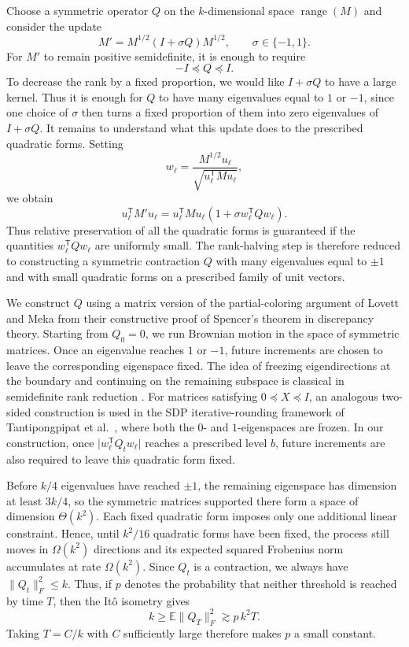 \documentclass[11pt,reqno,letterpaper]{amsart}
\newcommand{\E}{\mathbb E}
\begin{document}
Choose a symmetric operator $Q$ on the $k$-dimensional space
$\operatorname{range}(M)$ and consider the update
\[
 M'
 =
 M^{1/2}(I+\sigma Q)M^{1/2},
 \qquad \sigma\in\{-1,1\}.
\]
For $M'$ to remain positive semidefinite, it is
enough to require
\[
 -I\preceq Q\preceq I.
\]
To decrease the rank by a fixed proportion, we would like
$I+\sigma Q$ to have a large kernel. Thus it is enough for $Q$ to have
many eigenvalues equal to $1$ or $-1$, since one choice of $\sigma$
then turns a fixed proportion of them into zero eigenvalues of
$I+\sigma Q$. It remains to understand what this update does to the prescribed
quadratic forms. Setting
\[
 w_\ell
 =
 \frac{M^{1/2}u_\ell}
 {\sqrt{u_\ell^{\mathsf T}Mu_\ell}},
\]
we obtain
\[
 u_\ell^{\mathsf T}M'u_\ell
 =
 u_\ell^{\mathsf T}Mu_\ell
 \left(1+\sigma w_\ell^{\mathsf T}Qw_\ell\right).
\]
Thus relative preservation of all the quadratic forms is guaranteed if
the quantities $w_\ell^{\mathsf T}Qw_\ell$ are uniformly small. The
rank-halving step is therefore reduced to constructing a symmetric
contraction $Q$ with many eigenvalues equal to $\pm1$ and with small
quadratic forms on a prescribed family of unit vectors.

We construct $Q$ using a matrix version of the partial-coloring
argument of Lovett and Meka \cite{LM} from their constructive proof of
Spencer's theorem in discrepancy theory. Starting from $Q_0=0$, we run
Brownian motion in the space of symmetric matrices. Once an eigenvalue
reaches $1$ or $-1$, future increments are chosen to leave the
corresponding eigenspace fixed. The idea of freezing eigendirections at the boundary and continuing on the remaining subspace is classical in semidefinite rank reduction \cite{Barvinok,Pataki}. For matrices satisfying $0\preceq X\preceq I$, an analogous two-sided construction is used in the SDP iterative-rounding framework of Tantipongpipat et al.~\cite{TSSMV19}, where both the $0$- and $1$-eigenspaces are frozen. In our construction, once $\lvert w_\ell^{\mathsf T}Q_tw_\ell\rvert$ reaches a prescribed level $b$, future increments are also required to leave this quadratic form fixed.

Before $k/4$ eigenvalues have reached $\pm1$, the remaining eigenspace
has dimension at least $3k/4$, so the symmetric matrices supported there
form a space of dimension $\Theta(k^2)$. Each fixed quadratic form
imposes only one additional linear constraint. Hence, until $k^2/16$
quadratic forms have been fixed, the process still moves in
$\Omega(k^2)$ directions and its expected
squared Frobenius norm accumulates at rate $\Omega(k^2)$. Since $Q_t$ is a
contraction, we always have $\|Q_t\|_F^2\leq k$. Thus, if $p$ denotes
the probability that neither threshold is reached by time $T$, then the
It\^o isometry gives
\[
 k
 \geq
 \E\|Q_T\|_F^2
 \gtrsim
 p\,k^2T.
\]
Taking $T=C/k$ with $C$ sufficiently large therefore makes $p$ a small
constant.
\end{document}
